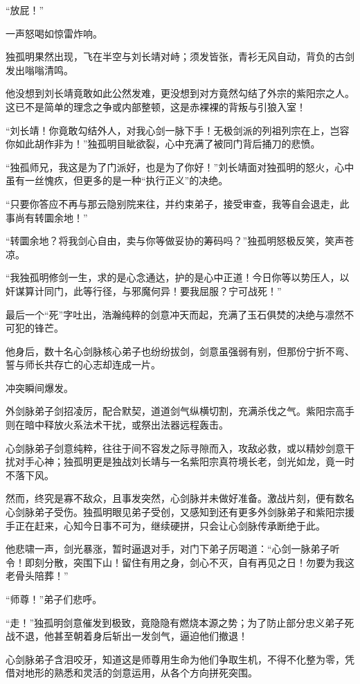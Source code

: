 “放屁！”

一声怒喝如惊雷炸响。

独孤明果然出现，飞在半空与刘长靖对峙；须发皆张，青衫无风自动，背负的古剑发出嗡嗡清鸣。

他没想到刘长靖竟敢如此公然发难，更没想到对方竟然勾结了外宗的紫阳宗之人。这已不是简单的理念之争或内部整顿，这是赤裸裸的背叛与引狼入室！

“刘长靖！你竟敢勾结外人，对我心剑一脉下手！无极剑派的列祖列宗在上，岂容你如此胡作非为！”独孤明目眦欲裂，心中充满了被同门背后捅刀的悲愤。

“独孤师兄，我这是为了门派好，也是为了你好！”刘长靖面对独孤明的怒火，心中虽有一丝愧疚，但更多的是一种“执行正义”的决绝。

“只要你答应不再与那云隐别院来往，并约束弟子，接受审查，我等自会退走，此事尚有转圜余地！”

“转圜余地？将我剑心自由，卖与你等做妥协的筹码吗？”独孤明怒极反笑，笑声苍凉。

“我独孤明修剑一生，求的是心念通达，护的是心中正道！今日你等以势压人，以奸谋算计同门，此等行径，与邪魔何异！要我屈服？宁可战死！”

最后一个“死”字吐出，浩瀚纯粹的剑意冲天而起，充满了玉石俱焚的决绝与凛然不可犯的锋芒。

他身后，数十名心剑脉核心弟子也纷纷拔剑，剑意虽强弱有别，但那份宁折不弯、誓与师长共存亡的心志却连成一片。

冲突瞬间爆发。

外剑脉弟子剑招凌厉，配合默契，道道剑气纵横切割，充满杀伐之气。紫阳宗高手则在暗中释放火系法术干扰，或祭出法器远程轰击。

心剑脉弟子剑意纯粹，往往于间不容发之际寻隙而入，攻敌必救，或以精妙剑意干扰对手心神；独孤明更是独战刘长靖与一名紫阳宗真符境长老，剑光如龙，竟一时不落下风。

然而，终究是寡不敌众，且事发突然，心剑脉并未做好准备。激战片刻，便有数名心剑脉弟子受伤。独孤明眼见弟子受创，又感知到还有更多外剑脉弟子和紫阳宗援手正在赶来，心知今日事不可为，继续硬拼，只会让心剑脉传承断绝于此。

他悲啸一声，剑光暴涨，暂时逼退对手，对门下弟子厉喝道：“心剑一脉弟子听令！即刻分散，突围下山！留住有用之身，剑心不灭，自有再见之日！勿要为我这老骨头陪葬！”

“师尊！”弟子们悲呼。

“走！”独孤明剑意催发到极致，竟隐隐有燃烧本源之势；为了防止部分忠义弟子死战不退，他甚至朝着身后斩出一发剑气，逼迫他们撤退！

心剑脉弟子含泪咬牙，知道这是师尊用生命为他们争取生机，不得不化整为零，凭借对地形的熟悉和灵活的剑意运用，从各个方向拼死突围。

